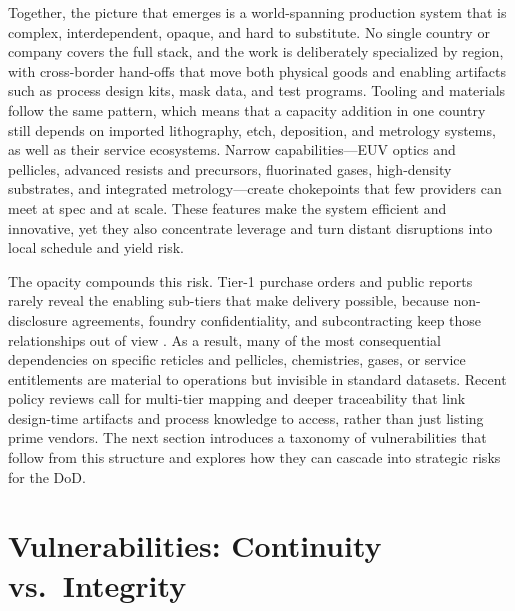 Together, the picture that emerges is a world-spanning production system that is complex, interdependent, opaque, and hard to substitute. No single country or company covers the full stack, and the work is deliberately specialized by region, with cross-border hand-offs that move both physical goods and enabling artifacts such as process design kits, mask data, and test programs. Tooling and materials follow the same pattern, which means that a capacity addition in one country still depends on imported lithography, etch, deposition, and metrology systems, as well as their service ecosystems. Narrow capabilities---EUV optics and pellicles, advanced resists and precursors, fluorinated gases, high-density substrates, and integrated metrology---create chokepoints that few providers can meet at spec and at scale. These features make the system efficient and innovative, yet they also concentrate leverage and turn distant disruptions into local schedule and yield risk.

The opacity compounds this risk. Tier-1 purchase orders and public reports rarely reveal the enabling sub-tiers that make delivery possible, because non-disclosure agreements, foundry confidentiality, and subcontracting keep those relationships out of view \parencite{oecd_measuring_2019}. As a result, many of the most consequential dependencies on specific reticles and pellicles, chemistries, gases, or service entitlements are material to operations but invisible in standard datasets. Recent policy reviews call for multi-tier mapping and deeper traceability that link design-time artifacts and process knowledge to access, rather than just listing prime vendors. The next section introduces a taxonomy of vulnerabilities that follow from this structure and explores how they can cascade into strategic risks for the DoD.


\section{Vulnerabilities: Continuity vs.\ Integrity}
\label{sec:risk-classes}

